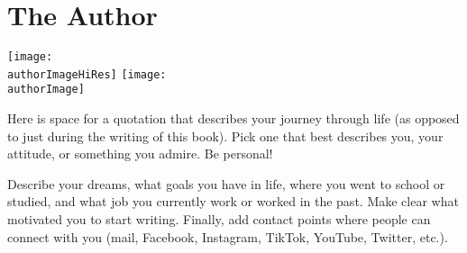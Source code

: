 


\chapter{The Author \yourName}\label{the-author:cha}

\begin{center}

\ifuseAuthorImage
\ifxetex
	\texttt{[image: \\authorImageHiRes]}
\else
	\texttt{[image: \\authorImage]}
\fi
\fi

\end{center}

\begin{myquotation} Here is space for a quotation that describes your journey through life (as opposed to just during the writing of this book). Pick one that best describes you, your attitude, or something you admire. Be personal!\end{myquotation}


Describe your dreams, what goals you have in life, where you went to school or studied, and what job you currently work or worked in the past. Make clear what motivated you to start writing. Finally, add contact points where people can connect with you (mail, Facebook, Instagram, TikTok, YouTube, Twitter, etc.). 

